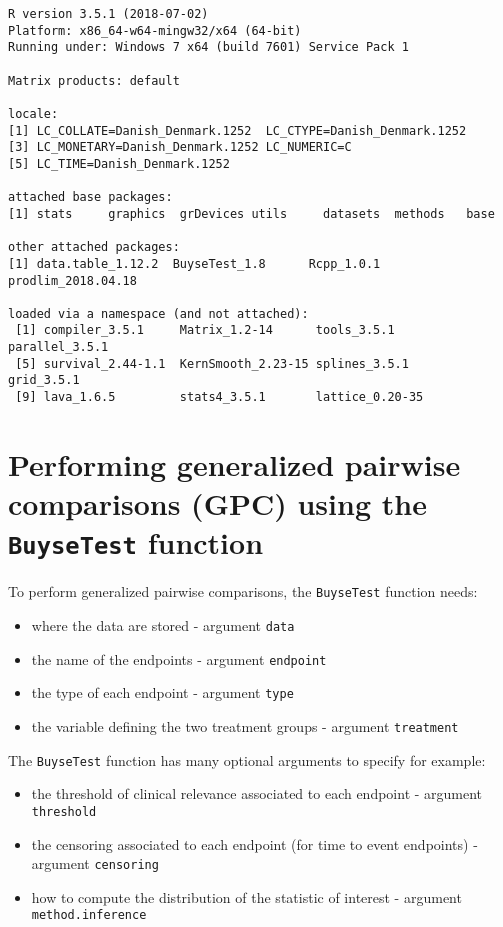 \documentclass[12pt]{article}
\begin{document}
\begin{verbatim}
R version 3.5.1 (2018-07-02)
Platform: x86_64-w64-mingw32/x64 (64-bit)
Running under: Windows 7 x64 (build 7601) Service Pack 1

Matrix products: default

locale:
[1] LC_COLLATE=Danish_Denmark.1252  LC_CTYPE=Danish_Denmark.1252   
[3] LC_MONETARY=Danish_Denmark.1252 LC_NUMERIC=C                   
[5] LC_TIME=Danish_Denmark.1252    

attached base packages:
[1] stats     graphics  grDevices utils     datasets  methods   base     

other attached packages:
[1] data.table_1.12.2  BuyseTest_1.8      Rcpp_1.0.1         prodlim_2018.04.18

loaded via a namespace (and not attached):
 [1] compiler_3.5.1     Matrix_1.2-14      tools_3.5.1        parallel_3.5.1    
 [5] survival_2.44-1.1  KernSmooth_2.23-15 splines_3.5.1      grid_3.5.1        
 [9] lava_1.6.5         stats4_3.5.1       lattice_0.20-35
\end{verbatim}






\clearpage

\section{Performing generalized pairwise comparisons (GPC) using the \texttt{BuyseTest} function}
\label{sec:orge6746c4}

To perform generalized pairwise comparisons, the \texttt{BuyseTest} function needs:
\begin{itemize}
\item where the data are stored \hfill - argument \texttt{data}
\item the name of the endpoints \hfill - argument \texttt{endpoint}
\item the type of each endpoint \hfill - argument \texttt{type}
\item the variable defining the two treatment groups \hfill - argument
\texttt{treatment}
\end{itemize}
The \texttt{BuyseTest} function has many optional arguments to specify for example:
\begin{itemize}
\item the threshold of clinical relevance associated to each endpoint \hfill - argument \texttt{threshold}
\item the censoring associated to each endpoint (for time to event endpoints) \hfill - argument \texttt{censoring}
\item how to compute the distribution of the statistic of interest \hfill - argument \texttt{method.inference}
\end{itemize}
\end{document}
